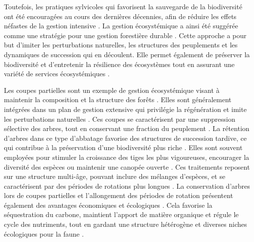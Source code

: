 Toutefois, les pratiques sylvicoles qui favorisent la sauvegarde de la biodiversité ont été encouragées au cours des dernières décennies, afin de réduire les effets néfastes de la gestion intensive \citep{Gustafsson2012Retentionforestry}. 
La gestion écosystémique a ainsi été suggérée comme une stratégie pour une gestion forestière durable \citep{Perry1998scientificbasis,Kuuluvainen2002Naturalvariabilitya}. 
Cette approche a pour but d'imiter les perturbations naturelles, les structures des peuplements et les dynamiques de succession qui en découlent. 
Elle permet également de préserver la biodiversité et d'entretenir la résilience des écosystèmes tout en assurant une variété de services écosystémiques \citep{Szaro1998emergenceecosystem,MacDicken2015Globalprogress}. 

Les coupes partielles sont un exemple de gestion écosystémique visant à maintenir la composition et la structure des forêts \citep{Bergeron1999Forestmanagementa}. 
Elles sont généralement intégrées dans un plan de gestion extensive qui privilégie la régénération et imite les perturbations naturelles \citep{Irland2011Timberproductivity}. 
Ces coupes se caractérisent par une suppression sélective des arbres, tout en conservant une fraction du peuplement \citep{Ameray2021Forestcarbon}. 
La rétention d'arbres dans ce type d'abbatage favorise des structures de succession tardive, ce qui contribue à la préservation d'une biodiversité plus riche \citep{Ameray2021Forestcarbon}. 
Elles sont souvent employées pour stimuler la croissance des tiges les plus vigoureuses, encourager la diversité des espèces ou maintenir une canopée ouverte \citep{Irland2011Timberproductivity}. 
Ces traitements reposent sur une structure multi-âge, pouvant inclure des mélanges d'espèces, et se caractérisent par des périodes de rotations plus longues \citep{Kuuluvainen2009Forestmanagement}. 
La conservation d'arbres lors de coupes partielles et l'allongement des périodes de rotation présentent également des avantages économiques et écologiques \citep{Ameray2021Forestcarbon}. 
Cela favorise la séquestration du carbone, maintient l'apport de matière organique et régule le cycle des nutriments, tout en gardant une structure hétérogène et diverses niches écologiques pour la faune \citep{Dahlgren1994effectswholetree,Barg1999Influencepartial,Tong2020Forestmanagement,Ameray2021Forestcarbon}. 


